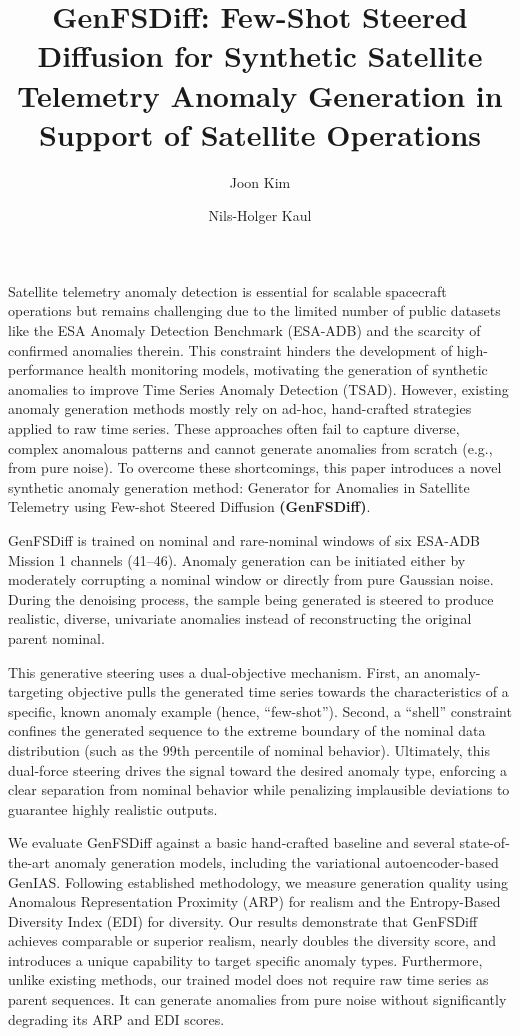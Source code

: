 \documentclass[11pt,a4paper]{article}
\title{GenFSDiff: Few-Shot Steered Diffusion for Synthetic Satellite Telemetry Anomaly Generation in Support of Satellite Operations}
\author[1]{Joon Kim}
\author[2]{Nils-Holger Kaul}
\affil[1]{Student, Space and Ground Segment Technology, Galileo Competence Center, DLR}
\affil[2]{Research Associate, Space and Ground Segment Technology, Galileo Competence Center, DLR}
\date{}
\begin{document}
\maketitle
Satellite telemetry anomaly detection is essential for scalable spacecraft operations but remains challenging due to the limited number of public datasets like the ESA Anomaly Detection Benchmark (ESA-ADB) and the scarcity of confirmed anomalies therein. This constraint hinders the development of high-performance health monitoring models, motivating the generation of synthetic anomalies to improve Time Series Anomaly Detection (TSAD). However, existing anomaly generation methods mostly rely on ad-hoc, hand-crafted strategies applied to raw time series. These approaches often fail to capture diverse, complex anomalous patterns and cannot generate anomalies from scratch (e.g., from pure noise). To overcome these shortcomings, this paper introduces a novel synthetic anomaly generation method: Generator for Anomalies in Satellite Telemetry using Few-shot Steered Diffusion \textbf{(GenFSDiff)}. 

GenFSDiff is trained on nominal and rare-nominal windows of six ESA-ADB Mission 1 channels (41–46). Anomaly generation can be initiated either by moderately corrupting a nominal window or directly from pure Gaussian noise. During the denoising process, the sample being generated is steered to produce realistic, diverse, univariate anomalies instead of reconstructing the original parent nominal. 

This generative steering uses a dual-objective mechanism. First, an anomaly-targeting objective pulls the generated time series towards the characteristics of a specific, known anomaly example (hence, ``few-shot''). Second, a ``shell'' constraint confines the generated sequence to the extreme boundary of the nominal data distribution (such as the 99th percentile of nominal behavior). Ultimately, this dual-force steering drives the signal toward the desired anomaly type, enforcing a clear separation from nominal behavior while penalizing implausible deviations to guarantee highly realistic outputs.

We evaluate GenFSDiff against a basic hand-crafted baseline and several state-of-the-art anomaly generation models, including the variational autoencoder-based GenIAS. Following established methodology, we measure generation quality using Anomalous Representation Proximity (ARP) for realism and the Entropy-Based Diversity Index (EDI) for diversity. Our results demonstrate that GenFSDiff achieves comparable or superior realism, nearly doubles the diversity score, and introduces a unique capability to target specific anomaly types. Furthermore, unlike existing methods, our trained model does not require raw time series as parent sequences. It can generate anomalies from pure noise without significantly degrading its ARP and EDI scores.
\end{document}
